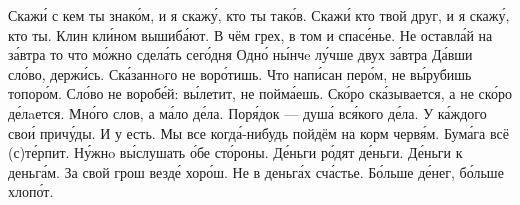 \documentclass[a4paper]{article}
\begin{document}
              {Скажи́ с кем ты знако́м, и я
              скажу́, кто ты тако́в.
              \mitem Скажи́ кто твой друг, и я
              скажу́, кто ты.}
              {Клин кли́ном вышиба́ют.
        \mitem В чём грех, в том и спасе́нье.
        }
             {Не оставла́й на за́втра то что мо́жно сдела́ть сего́дня
             \mitem Одно́ ны́нчe лу́чше двух за́втра
             }
         {Да́вши сло́во, держи́сь.}
              {Ска́заннoго не воро́тишь.
        \mitem Что напи́сан перо́м, не вы́рубишь топоро́м.
        \mitem Сло́во не воробе́й: вы́летит,
               не пойма́ешь.}
                     {Ско́ро  ска́зывается,
                     а не ско́ро
                      де́лaется.
        \mitem Мно́го слов, а ма́ло де́ла.}
         {Поря́док --- душа́ вся́кого де́ла.}
         {У ка́ждого свои́ причу́ды.}
               {И у   есть.}
         {Мы все когда́-нибудь пойдём на корм червя́м.}
         {Бума́га всё (с)те́рпит.}
         {Ну́жнo вы́слушать о́бе сто́роны.}
         {
         Де́ньги ро́дят де́ньги.
         }
         {Де́ньги к деньга́м.}
         {За свой грош везде́ хоро́ш.}
         {Не в деньга́х сча́стье.
        \mitem Бо́льше де́нег, бо́льше хлопо́т.}
\end{document}
